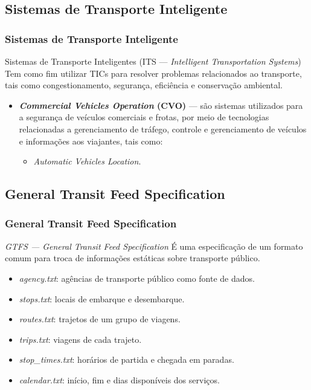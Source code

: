 \documentclass{beamer}
\begin{document}
\subsection{Sistemas de Transporte Inteligente}
\begin{frame}
\frametitle{Sistemas de Transporte Inteligente}
\begin{block}{Sistemas de Transporte Inteligentes (ITS --- \textit{Intelligent Transportation Systems})}
Tem como fim utilizar TICs para resolver problemas relacionados ao transporte, tais como congestionamento, segurança, eficiência e conservação ambiental. 
\end{block}
\begin{itemize}
\item \textbf{\textit{Commercial Vehicles Operation} (CVO)} --- são sistemas utilizados para a segurança de veículos comerciais e frotas, por meio de tecnologias relacionadas a gerenciamento de tráfego, controle e gerenciamento de veículos e informações aos viajantes, tais como:
\begin{itemize}
\item \textit{Automatic Vehicles Location}.
\end{itemize}
\end{itemize}
\end{frame}
\subsection{General Transit Feed Specification}
\begin{frame}
\frametitle{General Transit Feed Specification}
\begin{block}{\textit{GTFS --- General Transit Feed Specification}}
É uma especificação de um formato comum para troca de informações estáticas sobre transporte público.
\begin{itemize}
\item \textit{agency.txt}: agências de transporte público como fonte de dados.
\item \textit{stops.txt}: locais de embarque e desembarque.
\item \textit{routes.txt}: trajetos de um grupo de viagens.
\item \textit{trips.txt}: viagens de cada trajeto.
\item \textit{stop\_times.txt}: horários de partida e chegada em paradas.
\item \textit{calendar.txt}: início, fim e dias disponíveis dos serviços.
\end{itemize}
\end{block}
\end{frame}
\end{document}
